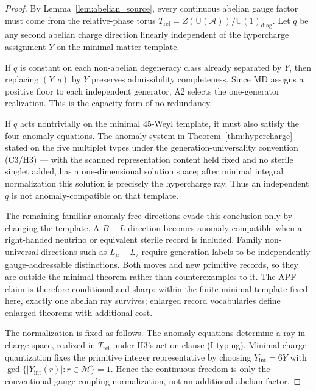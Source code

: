\documentclass[11pt]{article}
\theoremstyle{definition}
\begin{document}
\begin{proof}
By Lemma~\ref{lem:abelian_source}, every continuous abelian gauge factor must
come from the relative-phase torus
$T_{\mathrm{rel}}=Z(\mathrm U(\mathcal A))/\mathrm U(1)_{\mathrm{diag}}$.
Let $q$ be any second abelian charge direction linearly independent of the
hypercharge assignment $Y$ on the minimal matter template.

If $q$ is constant on each non-abelian degeneracy class already separated by
$Y$, then replacing $(Y,q)$ by $Y$ preserves admissibility completeness.  Since
MD assigns a positive floor to each independent generator, A2 selects the
one-generator realization.  This is the capacity form of no redundancy.

If $q$ acts nontrivially on the minimal 45-Weyl template, it must also satisfy
the four anomaly equations.  The anomaly system in
Theorem~\ref{thm:hypercharge} --- stated on the five multiplet types
under the generation-universality convention (C3/H3) --- with the
scanned representation content held fixed and no sterile singlet
added, has a one-dimensional solution space; after minimal integral
normalization this solution is precisely the hypercharge ray.  Thus an
independent $q$ is not anomaly-compatible on that template.

The remaining familiar anomaly-free directions evade this conclusion only by
changing the template.  A $B-L$ direction becomes anomaly-compatible when a
right-handed neutrino or equivalent sterile record is included.  Family
non-universal directions such as $L_\mu-L_\tau$ require generation labels to
be independently gauge-addressable distinctions.  Both moves add new primitive
records, so they are outside the minimal theorem rather than counterexamples to
it.  The APF claim is therefore conditional and sharp: within the finite
minimal template fixed here, exactly one abelian ray survives; enlarged
record vocabularies define enlarged theorems with additional cost.

The normalization is fixed as follows.  The anomaly equations determine a ray
in charge space, realized in $T_{\mathrm{rel}}$ under H3's action clause (I-typing).  Minimal charge quantization fixes the primitive
integer representative by choosing $Y_{\mathrm{int}}=6Y$ with
$\gcd\{|Y_{\mathrm{int}}(r)|:r\in\mathcal M\}=1$.  Hence the continuous
freedom is only the conventional gauge-coupling normalization, not an
additional abelian factor.
\end{proof}
\end{document}

